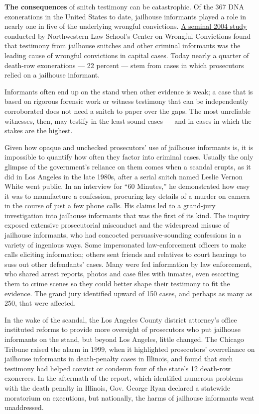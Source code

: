 \textbf{The consequences} of snitch testimony can be catastrophic. Of
the 367 DNA exonerations in the United States to date, jailhouse
informants played a role in nearly one in five of the underlying
wrongful convictions.
\href{http://www.law.northwestern.edu/legalclinic/wrongfulconvictions/documents/SnitchSystemBooklet.pdf}{A
seminal 2004 study} conducted by Northwestern Law School's Center on
Wrongful Convictions found that testimony from jailhouse snitches and
other criminal informants was the leading cause of wrongful convictions
in capital cases. Today nearly a quarter of death-row exonerations ---
22 percent --- stem from cases in which prosecutors relied on a
jailhouse informant.

Informants often end up on the stand when other evidence is weak; a case
that is based on rigorous forensic work or witness testimony that can be
independently corroborated does not need a snitch to paper over the
gaps. The most unreliable witnesses, then, may testify in the least
sound cases --- and in cases in which the stakes are the highest.

Given how opaque and unchecked prosecutors' use of jailhouse informants
is, it is impossible to quantify how often they factor into criminal
cases. Usually the only glimpse of the government's reliance on them
comes when a scandal erupts, as it did in Los Angeles in the late 1980s,
after a serial snitch named Leslie Vernon White went public. In an
interview for ``60 Minutes,'' he demonstrated how easy it was to
manufacture a confession, procuring key details of a murder on camera in
the course of just a few phone calls. His claims led to a grand-jury
investigation into jailhouse informants that was the first of its kind.
The inquiry exposed extensive prosecutorial misconduct and the
widespread misuse of jailhouse informants, who had concocted
persuasive-sounding confessions in a variety of ingenious ways. Some
impersonated law-enforcement officers to make calls eliciting
information; others sent friends and relatives to court hearings to suss
out other defendants' cases. Many were fed information by law
enforcement, who shared arrest reports, photos and case files with
inmates, even escorting them to crime scenes so they could better shape
their testimony to fit the evidence. The grand jury identified upward of
150 cases, and perhaps as many as 250, that were affected.

In the wake of the scandal, the Los Angeles County district attorney's
office instituted reforms to provide more oversight of prosecutors who
put jailhouse informants on the stand, but beyond Los Angeles, little
changed. The Chicago Tribune raised the alarm in 1999, when it
highlighted prosecutors' overreliance on jailhouse informants in
death-penalty cases in Illinois, and found that such testimony had
helped convict or condemn four of the state's 12 death-row exonerees. In
the aftermath of the report, which identified numerous problems with the
death penalty in Illinois, Gov. George Ryan declared a statewide
moratorium on executions, but nationally, the harms of jailhouse
informants went unaddressed.

